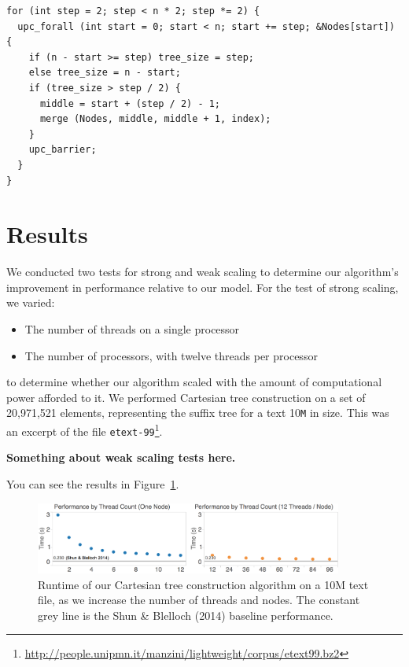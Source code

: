 \documentclass[10pt]{article}
\begin{document}
\lstset{language=C}
\begin{minipage}{\linewidth}
\begin{lstlisting}
for (int step = 2; step < n * 2; step *= 2) {
  upc_forall (int start = 0; start < n; start += step; &Nodes[start]) {
    if (n - start >= step) tree_size = step;
    else tree_size = n - start;
    if (tree_size > step / 2) {
      middle = start + (step / 2) - 1;
      merge (Nodes, middle, middle + 1, index);
    }
    upc_barrier;
  }
}
\end{lstlisting}
\end{minipage}

\section{Results}

We conducted two tests for strong and weak scaling to determine our algorithm's improvement
in performance relative to our model.
For the test of strong scaling, we varied:
\begin{itemize}[noitemsep]
  \item The number of threads on a single processor
  \item The number of processors, with twelve threads per processor
\end{itemize}
to determine whether our algorithm scaled with the amount of computational power afforded to it.
We performed Cartesian tree construction on a set of 20,971,521 elements, representing the suffix
tree for a text 10\texttt{M} in size.
This was an excerpt of the file
\texttt{etext-99}\footnote{\url{http://people.unipmn.it/manzini/lightweight/corpus/etext99.bz2}}.

\textbf{Something about weak scaling tests here.}

You can see the results in Figure~\ref{fig:benchmarks}.

\begin{figure}
\centering
\includegraphics[width=0.9\textwidth]{figures/benchmarks}
\caption{%
Runtime of our Cartesian tree construction algorithm on a 10M text file, as we increase the number of threads and nodes.
The constant grey line is the Shun \& Blelloch (2014) baseline performance.
}
\label{fig:benchmarks}
\end{figure}
\end{document}
